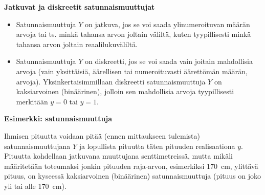 \documentclass[
]{book}
\providecommand{\tightlist}{%
  \setlength{\itemsep}{0pt}\setlength{\parskip}{0pt}}
\begin{document}
\begin{defblock}{}

\textbf{Jatkuvat ja diskreetit satunnaismuuttujat}

\begin{itemize}
\tightlist
\item
  Satunnaismuuttuja \(Y\) on jatkuva, jos se voi saada ylinumeroituvan määrän arvoja tai ts. minkä tahansa arvon joltain väliltä, kuten tyypillisesti minkä tahansa arvon joltain reaalilukuväliltä.
\item
  Satunnaismuuttuja \(Y\) on diskreetti, jos se voi saada vain joitain mahdollisia arvoja (vain yksittäisiä, äärellisen tai numeroituvasti äärettömän määrän, arvoja). Yksinkertaisimmillaan diskreetti satunnaismuuttuja \(Y\) on kaksiarvoinen (binäärinen), jolloin sen mahdollisia arvoja tyypillisesti merkitään \(y=0\) tai \(y=1\).
\end{itemize}

\end{defblock}

\begin{eblock}{}
\textbf{Esimerkki: satunnaismuuttuja}

Ihmisen pituutta voidaan pitää (ennen mittaukseen tulemista) satunnaismuuttujana \(Y\) ja lopullista pituutta täten pituuden realisaationa \(y\). Pituutta kohdellaan jatkuvana muuttujana senttimetreissä, mutta mikäli määritetään toteumaksi jonkin pituuden raja-arvon, esimerkiksi 170~cm, ylittävä pituus, on kyseessä kaksiarvoinen (binäärinen) satunnaismuuttuja (pituus on joko yli tai alle 170~cm).

\end{eblock}
\end{document}
